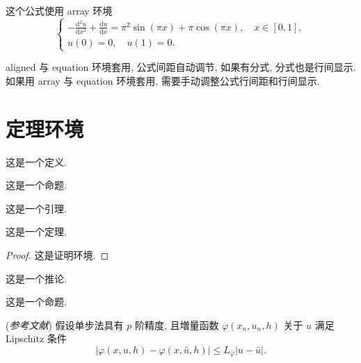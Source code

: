 这个公式使用 array 环境
\begin{equation}\label{eq:arrayEq}
\left\{\begin{array}{l}
\displaystyle
-\frac{\mathrm{d}^{2} u}{\mathrm{d} x^{2}}+\frac{\mathrm{d} u}{\mathrm{d} x}=\pi^{2} \sin (\pi x)+\pi \cos (\pi x),\quad x \in [0,1], \\[6pt]
u(0)=0,\quad u(1)=0.
\end{array} \right.
\end{equation}

aligned 与 equation 环境套用, 公式间距自动调节, 如果有分式, 分式也是行间显示. 如果用 array 与 equation 环境套用, 需要手动调整公式行间距和行间显示.


\section{定理环境}

\begin{definition}\label{def:foo}
这是一个定义.
\end{definition}

\begin{proposition}\label{prop:foo}
这是一个命题.
\end{proposition}

\begin{lemma}[Lemma]\label{lmm:foo}
这是一个引理.
\end{lemma}

\begin{theorem}[Theorem]\label{thm:foo}
这是一个定理.
\end{theorem}
\begin{proof}
这是证明环境.
\end{proof}

\begin{corollary}\label{cor:foo}
这是一个推论.
\end{corollary}

\begin{proposition}[Proposition]
这是一个命题.
\end{proposition}

\begin{lemma}\label{lmm:convergence} {\rm (\textit{参考文献}\cite{LiLiu1997})}
假设单步法具有 $p$ 阶精度, 且増量函数 $\varphi(x_{n}, u_{n}, h)$ 关于 $u$ 满足 \textup{Lipschitz} 条件
\begin{equation}\label{eq:conver1}
|\varphi(x, u, h)-\varphi(x, \bar{u}, h)| \leqslant L_{\varphi}|u-\bar{u}|.
\end{equation}
\end{lemma}

